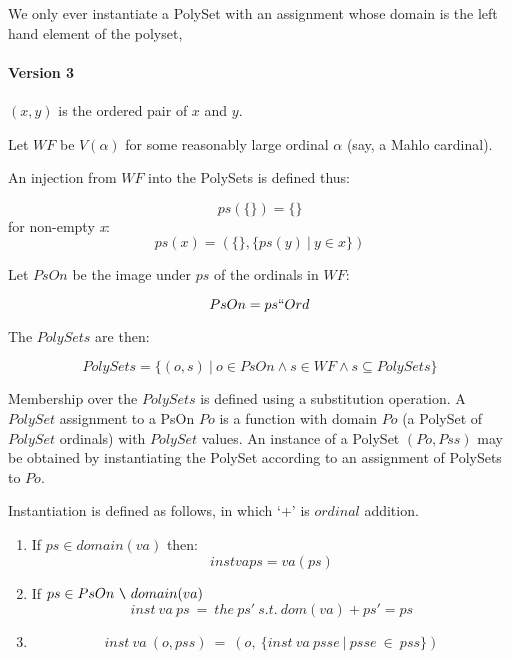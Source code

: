 \documentclass[numreferences]{rbjk}
\begin{document}
\begin{article}
We only ever instantiate a PolySet with an assignment whose domain is the left hand element of the polyset,

\paragraph{Version 3}

$(x,y)$ is the ordered pair of $x$ and $y$.

Let $WF$ be $V(\alpha)$ for some reasonably large ordinal $\alpha$ (say, a Mahlo cardinal).

An injection from $WF$ into the PolySets is defined thus:

\begin{displaymath}
ps(\{\}) = \{\}
\end{displaymath}
for non-empty \emph{x}:
\begin{displaymath}
ps(x) = (\{\}, \{ ps(y)\ |\ y \in x\})
\end{displaymath}

Let $PsOn$ be the image under $ps$ of the ordinals in $WF$:

\begin{displaymath}
PsOn = ps `` Ord
\end{displaymath}

The $PolySets$ are then:

\begin{displaymath}
PolySets = \{(o,s)\ |\ o \in PsOn \land s \in WF \land s \subseteq PolySets\}
\end{displaymath}

Membership over the $PolySets$ is defined using a substitution operation.
A $PolySet$ assignment to a PsOn $Po$ is a function with domain $Po$ (a PolySet of $PolySet$ ordinals) with $PolySet$ values.
An instance of a PolySet $(Po, Pss)$ may be obtained by instantiating the PolySet according to an assignment of PolySets to $Po$.

Instantiation is defined as follows, in which `$+$' is $ordinal$ addition.

\begin{enumerate}
\item
If $ps \in domain(va)$ then:
\begin{displaymath}
 inst va ps = va (ps)
\end{displaymath}
\item
If $ps \in PsOn\ \verb!\!\ domain(va)$
\begin{displaymath}
 inst\ va\ ps\ =\ the\ ps'\ s.t.\ dom(va)+ps'=ps
\end{displaymath}
\item
\begin{displaymath}
inst\ va\ (o,pss)\ =\ (o,\ \{inst\ va\ psse\ |\ psse\ \in\ pss\})
\end{displaymath} 
\end{enumerate}


\end{article}
\end{document}
